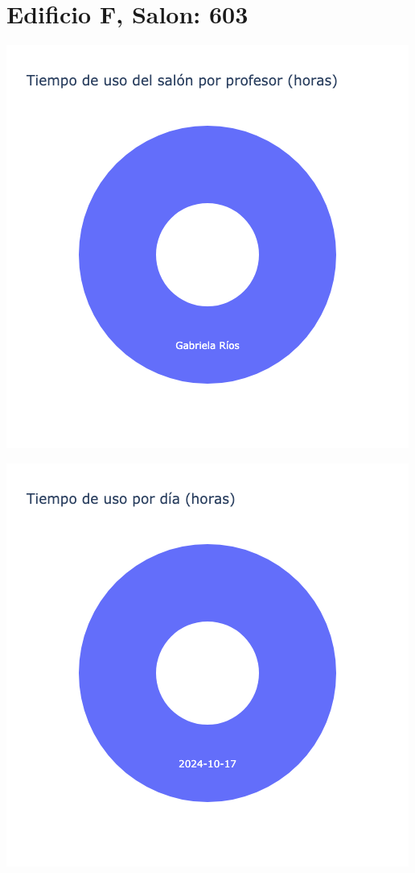 \documentclass{article}
\begin{document}
    \section{Edificio F, Salon: 603}
    \noindent
    \begin{minipage}{0.48\textwidth}
        \centering
        \includegraphics[width=\textwidth]{../img/pie/UP603-90Dias-03-12-2024.png}
    \end{minipage}
    \hfill
    \begin{minipage}{0.48\textwidth}
        \centering
        \includegraphics[width=\textwidth]{../img/pie/UD603-90Dias-03-12-2024.png}
    \end{minipage}
    
\end{document}
